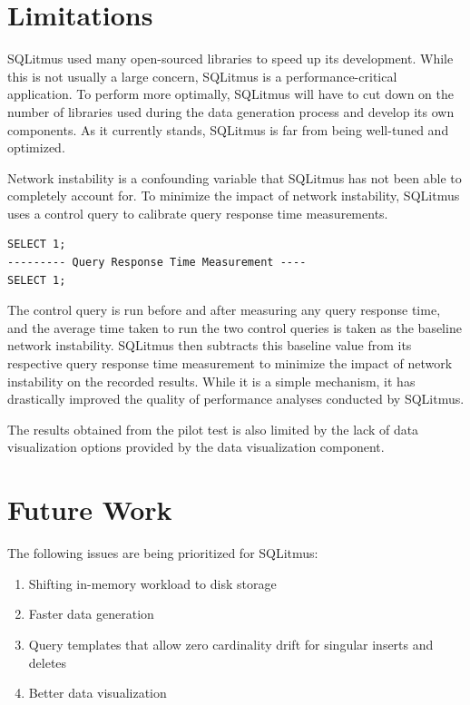 \documentclass[12pt]{report}
\begin{document}
\begin{spacing}{1.9}
	
	
	\section{Limitations}
	
	SQLitmus used many open-sourced libraries to speed up its development. While this is not usually a large concern, SQLitmus is a performance-critical application. To perform more optimally, SQLitmus will have to cut down on the number of libraries used during the data generation process and develop its own components. As it currently stands, SQLitmus is far from being well-tuned and optimized. 
	
	Network instability is a confounding variable that SQLitmus has not been able to completely account for. To minimize the impact of network instability, SQLitmus uses a control query to calibrate query response time measurements. 
	\begin{verbatim}
SELECT 1;
--------- Query Response Time Measurement ----
SELECT 1;
	\end{verbatim}
	The control query is run before and after measuring any query response time, and the average time taken to run the two control queries is taken as the baseline network instability. SQLitmus then subtracts this baseline value from its respective query response time measurement to minimize the impact of network instability on the recorded results. While it is a simple mechanism, it has drastically improved the quality of performance analyses conducted by SQLitmus.
	
	The results obtained from the pilot test is also limited by the lack of data visualization options provided by the data visualization component.
	
	\section{Future Work}
	
	The following issues are being prioritized for SQLitmus:
	\begin{enumerate}
		\item Shifting in-memory workload to disk storage
		\item Faster data generation
		\item Query templates that allow zero cardinality drift for singular inserts and deletes
		\item Better data visualization
	\end{enumerate}
	

\end{spacing}
\end{document}
